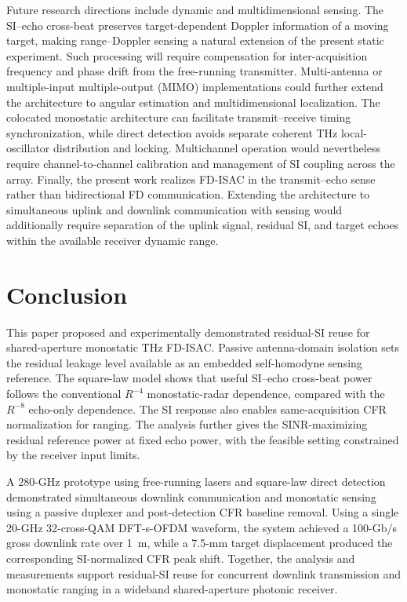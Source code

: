 \documentclass[10pt,journal]{IEEEtran}
\DeclareRobustCommand{\rev}[1]{\textcolor{revisioncolor}{#1}}
\begin{document}
Future research directions include dynamic and multidimensional
sensing. The SI--echo cross-beat preserves target-dependent Doppler information of a
moving target, making range--Doppler sensing a natural extension of
the present static experiment. Such processing will require
compensation for inter-acquisition frequency and phase drift from the
free-running transmitter. Multi-antenna or multiple-input multiple-output
(MIMO) implementations could
further extend the architecture to angular estimation and
multidimensional localization. The colocated monostatic architecture
can facilitate transmit--receive timing synchronization, while direct
detection avoids separate coherent THz local-oscillator distribution
and locking. Multichannel operation would nevertheless require
channel-to-channel calibration and management of SI coupling across
the array. Finally, the present work realizes FD-ISAC in the
transmit--echo sense rather than bidirectional FD communication.
Extending the architecture to simultaneous uplink and downlink
communication with sensing would additionally require separation of
the uplink signal, residual SI, and target echoes within the available
receiver dynamic range.

\section{Conclusion}
\label{sec:conclusion}

This paper proposed and experimentally demonstrated residual-SI reuse
for shared-aperture monostatic THz FD-ISAC. Passive antenna-domain
\rev{isolation sets the residual leakage level available as an
embedded self-homodyne sensing reference.} The
square-law model shows that useful SI--echo cross-beat power follows
the conventional $R^{-4}$ monostatic-radar dependence, compared with
the $R^{-8}$ echo-only dependence. The SI response also enables
same-acquisition CFR normalization for ranging. The analysis further
\rev{gives the SINR-maximizing residual reference power at fixed echo
power, with the feasible setting constrained by the receiver
input limits.}

A 280-GHz prototype using free-running lasers and square-law direct
detection demonstrated simultaneous downlink communication and
monostatic sensing \rev{using a passive duplexer and post-detection CFR baseline removal.} Using a single 20-GHz 32-cross-QAM DFT-s-OFDM
waveform, the system achieved a 100-Gb/s gross downlink rate over
1~m, while a 7.5-mm target displacement produced the corresponding
SI-normalized CFR peak shift. Together, the analysis and measurements
\rev{support residual-SI reuse for concurrent downlink transmission
and monostatic ranging in a wideband shared-aperture photonic
receiver.}




\end{document}
